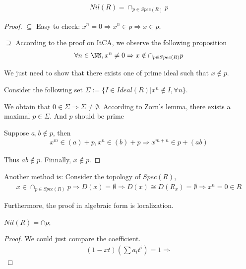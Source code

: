 \documentclass[Total.tex]{subfiles}
\begin{document}
					\begin{proposition}
						\begin{gather*}
							Nil(R)=\cap_{p\in Spec(R)} p
						\end{gather*}
					\end{proposition}
					\begin{proof}
						$\subseteq$ Easy to check: $x^n=0\Rightarrow x^n\in p\Rightarrow x\in p$;
						
						$\supseteq$ According to the proof on ItCA, we observe the following proposition
						\begin{gather*}
							\forall n\in \NN,x^n\not=0\Rightarrow x\notin \cap_{p\in Spec(R)} p
						\end{gather*}
						
						We just need to show that there exists one of prime ideal such that $x\notin p$. 
						
						Consider the following set $\Sigma:=\{I\in Ideal(R)|x^n\notin I,\forall n\}$. 
						
						We obtain that $0\in \Sigma\Rightarrow \Sigma\not=\emptyset$. According to Zorn's lemma, there exists a maximal $p\in \Sigma$. And $p$ should be prime
						
						
						Suppose $a,b\notin p$, then 
						\begin{gather*}
							x^m\in (a)+p,x^n\in (b)+p\Rightarrow x^{m+n}\in p+(ab)
						\end{gather*}
						
						Thus $ab\notin p$. Finnally, $x\notin p$. 
					\end{proof}
					
					Another method is: Consider the topology of $Spec(R)$,
					\begin{gather*}
						x\in \cap_{p\in Spec(R)} p\Rightarrow D(x)=\emptyset\Rightarrow D(x)\cong D(R_x)=\emptyset\Rightarrow x^n=0\in R
					\end{gather*}
					
					
					Furthermore, the proof in algebraic form is localization.
					
				
					
					\begin{corollary}
						$Nil(R)=\cap p$;
					\end{corollary}
					\begin{proof}
						We could just compare the coefficient. 
						\begin{gather*}
							(1-xt)(\sum a_i t^i)=1\Rightarrow 
						\end{gather*}
					\end{proof}
					
\end{document}
